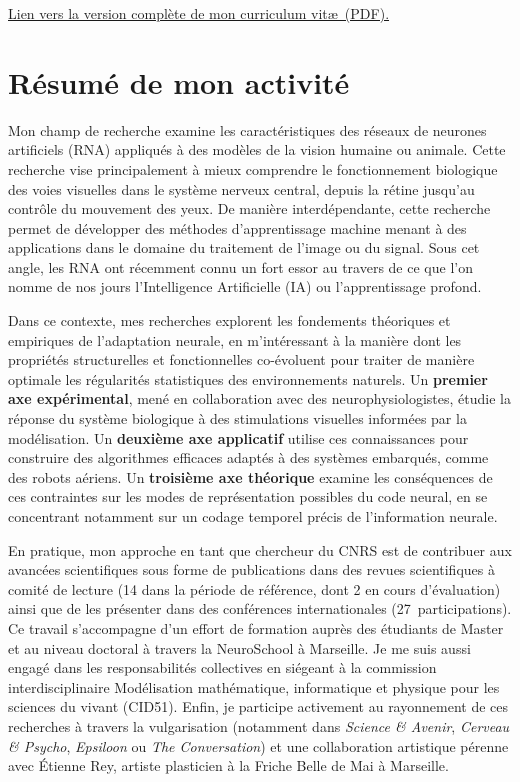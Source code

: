 \documentclass[11pt,french,a4paper,oneside]{article}
\begin{document}
\medskip
\noindent\href{https://github.com/laurentperrinet/perrinet_curriculum-vitae.tex/blob/master/perrinet_curriculum-vitae-full.pdf}{Lien vers la version complète de mon curriculum vit\ae\ (PDF).}

\section{Résumé de mon activité}

Mon champ de recherche examine les caractéristiques des réseaux de neurones artificiels (RNA) appliqués à des modèles de la vision humaine ou animale. Cette recherche vise principalement à mieux comprendre le fonctionnement biologique des voies visuelles dans le système nerveux central, depuis la rétine jusqu'au contrôle du mouvement des yeux. De manière interdépendante, cette recherche permet de développer des méthodes d'apprentissage machine menant à des applications dans le domaine du traitement de l'image ou du signal. Sous cet angle, les RNA ont récemment connu un fort essor au travers de ce que l'on nomme de nos jours l'Intelligence Artificielle (IA) ou l'apprentissage profond.

Dans ce contexte, mes recherches explorent les fondements théoriques et empiriques de l'adaptation neurale, en m'intéressant à la manière dont les propriétés structurelles et fonctionnelles co-évoluent pour traiter de manière optimale les régularités statistiques des environnements naturels. Un \textbf{premier axe expérimental}, mené en collaboration avec des neurophysiologistes, étudie la réponse du système biologique à des stimulations visuelles informées par la modélisation. Un \textbf{deuxième axe applicatif} utilise ces connaissances pour construire des algorithmes efficaces adaptés à des systèmes embarqués, comme des robots aériens. Un \textbf{troisième axe théorique} examine les conséquences de ces contraintes sur les modes de représentation possibles du code neural, en se concentrant notamment sur un codage temporel précis de l'information neurale.

En pratique, mon approche en tant que chercheur du CNRS est de contribuer aux avancées scientifiques sous forme de publications dans des revues scientifiques à comité de lecture (14 dans la période de référence, dont 2 en cours d'évaluation) ainsi que de les présenter dans des conférences internationales (27~participations). Ce travail s'accompagne d'un effort de formation auprès des étudiants de Master et au niveau doctoral à travers la \og NeuroSchool \fg{} à Marseille. Je me suis aussi engagé dans les responsabilités collectives en siégeant à la commission interdisciplinaire \og Modélisation mathématique, informatique et physique pour les sciences du vivant \fg{} (CID51). Enfin, je participe activement au rayonnement de ces recherches à travers la vulgarisation (notamment dans \emph{Science \& Avenir}, \emph{Cerveau \& Psycho}, \emph{Epsiloon} ou \emph{The Conversation}) et une collaboration artistique pérenne avec Étienne Rey, artiste plasticien à la Friche Belle de Mai à Marseille.
\end{document}
